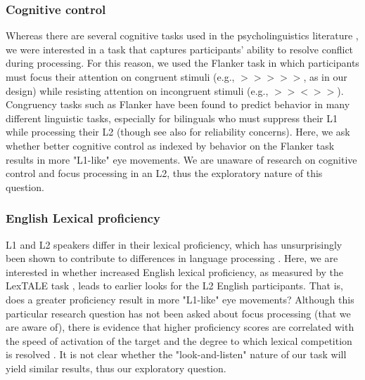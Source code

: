 \subsubsection{Cognitive control}
Whereas there are several cognitive tasks used in the psycholinguistics literature \citep{ness2023state}, we were interested in a task that captures participants' ability to resolve conflict during processing. For this reason, we used the Flanker task \citep{eriksen1974effects} in which 
participants must focus their attention on congruent stimuli (e.g., $>>>>>$, as in our design) while resisting attention on incongruent stimuli (e.g., $>><>>$). Congruency tasks such as Flanker have been found to predict behavior in many different linguistic tasks, especially for bilinguals who must suppress their L1 while processing their L2 \citep{blumenfeld2014cognitive,luk2011there} (though see also \cite{hedge2018reliability} for reliability concerns). Here, we ask whether better cognitive control as indexed by behavior on the Flanker task results in more "L1-like" eye movements. We are unaware of research on cognitive control and focus processing in an L2, thus the exploratory nature of this question.



\subsubsection{English Lexical proficiency}
L1 and L2 speakers differ in their lexical proficiency, which has unsurprisingly been shown to contribute to differences in language processing \citep{Yap2012, zareva2005relationship}. Here, we are interested in whether increased English lexical proficiency, as measured by the LexTALE task \citep{lemhofer2012introducing}, leads to earlier looks for the L2 English participants. That is, does a greater proficiency result in more "L1-like" eye movements? Although this particular research question has not been asked about focus processing (that we are aware of), there is evidence that higher proficiency scores are correlated with the speed of activation of the target and the degree to which lexical competition is resolved \citep{sarrett2022within}. It is not clear whether the "look-and-listen" nature of our task will yield similar results, thus our exploratory question.

 

